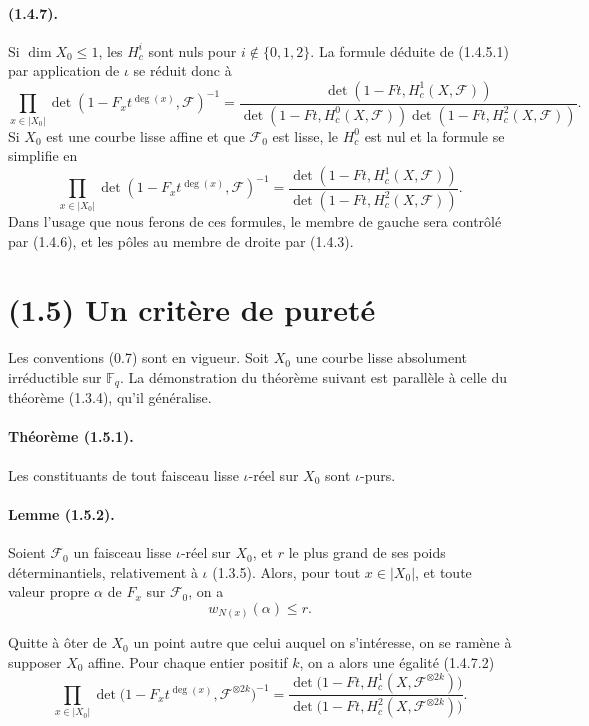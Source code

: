 \documentclass[11pt]{article}
\theoremstyle{remark}
\newcommand{\Fq}{\mathbb{F}_q}
\begin{document}
\paragraph{(1.4.7).} Si $\dim X_0\le 1$, les $H^i_c$ sont nuls pour $i\notin\{0,1,2\}$. La formule déduite de (1.4.5.1) par application de $\iota$ se réduit donc à
\begin{equation}\tag{1.4.7.1}
\prod_{x\in |X_0|}\det(1-F_x t^{\deg(x)},\mathcal F)^{-1}
=
\frac{\det(1-Ft,H^1_c(X,\mathcal F))}
{\det(1-Ft,H^0_c(X,\mathcal F))\det(1-Ft,H^2_c(X,\mathcal F))}.
\end{equation}
Si $X_0$ est une courbe lisse affine et que $\mathcal F_0$ est lisse, le $H^0_c$ est nul et la formule se simplifie en
\begin{equation}\tag{1.4.7.2}
\prod_{x\in |X_0|}\det(1-F_x t^{\deg(x)},\mathcal F)^{-1}
=
\frac{\det(1-Ft,H^1_c(X,\mathcal F))}
{\det(1-Ft,H^2_c(X,\mathcal F))}.
\end{equation}
Dans l'usage que nous ferons de ces formules, le membre de gauche sera contrôlé par (1.4.6), et les pôles au membre de droite par (1.4.3).



\section*{(1.5) Un critère de pureté}

Les conventions (0.7) sont en vigueur. Soit $X_0$ une courbe lisse absolument irréductible sur $\Fq$. La démonstration du théorème suivant est parallèle à celle du théorème (1.3.4), qu'il généralise.

\paragraph{Théorème (1.5.1).} Les constituants de tout faisceau lisse $\iota$-réel sur $X_0$ sont $\iota$-purs.

\paragraph{Lemme (1.5.2).} Soient $\mathcal F_0$ un faisceau lisse $\iota$-réel sur $X_0$, et $r$ le plus grand de ses poids déterminantiels, relativement à $\iota$ (1.3.5). Alors, pour tout $x\in |X_0|$, et toute valeur propre $\alpha$ de $F_x$ sur $\mathcal F_0$, on a
\[
w_{N(x)}(\alpha)\le r.
\]

Quitte à ôter de $X_0$ un point autre que celui auquel on s'intéresse, on se ramène à supposer $X_0$ affine. Pour chaque entier positif $k$, on a alors une égalité (1.4.7.2)
\begin{equation}\tag{1.5.2.1}
\prod_{x\in |X_0|}\det\bigl(1-F_x t^{\deg(x)},\mathcal F^{\otimes 2k}\bigr)^{-1}
=
\frac{\det\bigl(1-Ft,H^1_c(X,\mathcal F^{\otimes 2k})\bigr)}
{\det\bigl(1-Ft,H^2_c(X,\mathcal F^{\otimes 2k})\bigr)}.
\end{equation}
\end{document}
